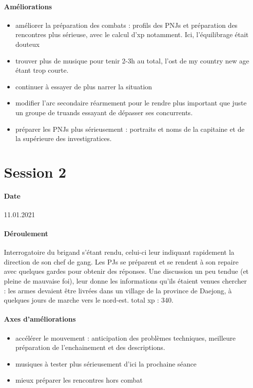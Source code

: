 \documentclass[10pt,a4paper]{book}
\begin{document}
\paragraph{Améliorations}
\begin{itemize}
\item améliorer la préparation des combats : profils des PNJs et préparation des rencontres plus sérieuse, avec le calcul d'xp notamment. Ici, l'équilibrage était douteux
\item trouver plus de musique pour tenir 2-3h au total, l'ost de my country new age étant trop courte.
\item continuer à essayer de plus narrer la situation
\item modifier l'arc secondaire réarmement pour le rendre plus important que juste un groupe de truands essayant de dépasser ses concurrents.
\item préparer les PNJs plus sérieusement : portraits et noms de la capitaine et de la supérieure des investigratices.
\end{itemize}
\section{Session 2}
\paragraph{Date}11.01.2021
\paragraph{Déroulement}
Interrogatoire du brigand s'étant rendu, celui-ci leur indiquant rapidement la direction de son chef de gang. Les PJs se préparent et se rendent à son repaire avec quelques gardes pour obtenir des réponses. Une discussion un peu tendue (et pleine de mauvaise foi), leur donne les informations qu'ils étaient venues chercher : les armes devaient être livrées dans un village de la province de Daejong, à quelques jours de marche vers le nord-est. total xp : 340.
\paragraph{Axes d'améliorations}
\begin{itemize}
\item accélérer le mouvement : anticipation des problèmes techniques, meilleure préparation de l'enchainement et des descriptions.
\item musiques à tester plus sérieusement d'ici la prochaine séance
\item mieux préparer les rencontres hors combat
\end{itemize}
\end{document}
